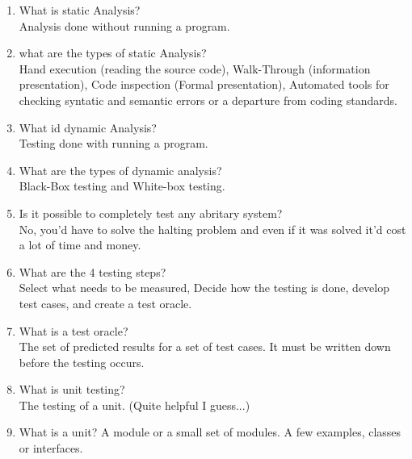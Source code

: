 \documentclass[10pt]{article}
\begin{document}
\begin{enumerate}
      \item What is static Analysis?\\
            Analysis done without running a program.

      \item what are the types of static Analysis?\\
            Hand execution (reading the source code), Walk-Through (information presentation), Code inspection (Formal presentation), Automated tools for checking syntatic and semantic errors or a departure from coding standards.\\

      \item What id dynamic Analysis?\\
            Testing done with running a program.\\

      \item What are the types of dynamic analysis?\\
            Black-Box testing and White-box testing.\\

      \item Is it possible to completely test any abritary system?\\
            No, you'd have to solve the halting problem and even if it was solved it'd cost a lot of time and money.\\


      \item What are the 4 testing steps?\\
            Select what needs to be measured, Decide how the testing is done, develop test cases, and create a test oracle.


      \item What is a test oracle?\\
            The set of predicted results for a set of test cases. It must be written down before the testing occurs.\\

      \item What is unit testing?\\
            The testing of a unit. (Quite helpful I guess...)\\

      \item What is a unit?
            A module or a small set of modules. A few examples, classes or interfaces.\\


\end{enumerate}
\end{document}
